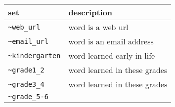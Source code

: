 \documentclass[]{article}
\begin{document}
\begin{longtable}[]{@{}ll@{}}
\toprule
\begin{minipage}[b]{0.22\columnwidth}\raggedright\strut
set\strut
\end{minipage} & \begin{minipage}[b]{0.41\columnwidth}\raggedright\strut
description\strut
\end{minipage}\tabularnewline
\midrule
\endhead
\begin{minipage}[t]{0.22\columnwidth}\raggedright\strut
\texttt{\textasciitilde{}web\_url}\strut
\end{minipage} & \begin{minipage}[t]{0.41\columnwidth}\raggedright\strut
word is a web url\strut
\end{minipage}\tabularnewline
\begin{minipage}[t]{0.22\columnwidth}\raggedright\strut
\texttt{\textasciitilde{}email\_url}\strut
\end{minipage} & \begin{minipage}[t]{0.41\columnwidth}\raggedright\strut
word is an email address\strut
\end{minipage}\tabularnewline
\begin{minipage}[t]{0.22\columnwidth}\raggedright\strut
\texttt{\textasciitilde{}kindergarten}\strut
\end{minipage} & \begin{minipage}[t]{0.41\columnwidth}\raggedright\strut
word learned early in life\strut
\end{minipage}\tabularnewline
\begin{minipage}[t]{0.22\columnwidth}\raggedright\strut
\texttt{\textasciitilde{}grade1\_2}\strut
\end{minipage} & \begin{minipage}[t]{0.41\columnwidth}\raggedright\strut
word learned in these grades\strut
\end{minipage}\tabularnewline
\begin{minipage}[t]{0.22\columnwidth}\raggedright\strut
\texttt{\textasciitilde{}grade3\_4}\strut
\end{minipage} & \begin{minipage}[t]{0.41\columnwidth}\raggedright\strut
word learned in these grades\strut
\end{minipage}\tabularnewline
\begin{minipage}[t]{0.22\columnwidth}\raggedright\strut
\texttt{\textasciitilde{}grade\_5-6}\strut
\end{minipage} & \begin{minipage}[t]{0.41\columnwidth}\raggedright\strut

\end{minipage}
\end{longtable}
\end{document}
